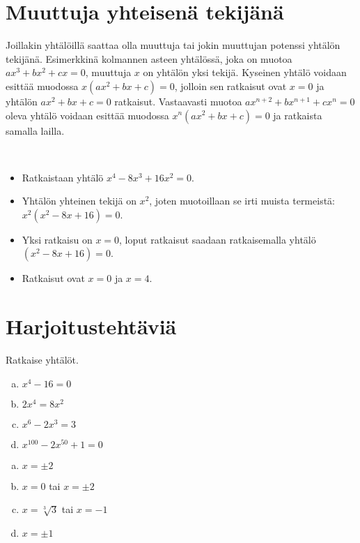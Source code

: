 \section{Muuttuja yhteisenä tekijänä}

Joillakin yhtälöillä saattaa olla muuttuja tai jokin muuttujan potenssi yhtälön tekijänä. Esimerkkinä kolmannen asteen yhtälössä, joka on muotoa $ax^3+bx^2+cx=0$, muuttuja $x$ on yhtälön yksi tekijä. Kyseinen yhtälö voidaan esittää muodossa $x(ax^2+bx+c)=0$, jolloin sen ratkaisut ovat $x=0$ ja yhtälön $ax^2+bx+c=0$ ratkaisut. Vastaavasti muotoa $ax^{n+2}+bx^{n+1}+cx^n=0$ oleva yhtälö voidaan esittää muodossa $x^n(ax^2+bx+c)=0$ ja ratkaista samalla lailla.

\begin{esimerkki}{\ }
\begin{itemize}
    \item Ratkaistaan yhtälö $x^4-8x^3+16x^2=0$.
    \item Yhtälön yhteinen tekijä on $x^2$, joten muotoillaan se irti muista termeistä: $x^2(x^2-8x+16)=0$.
    \item Yksi ratkaisu on $x=0$, loput ratkaisut saadaan ratkaisemalla yhtälö $(x^2-8x+16)=0$.
    \item Ratkaisut ovat $x=0$ ja $x=4$.

\end{itemize}
\end{esimerkki}

\section{Harjoitustehtäviä}

\begin{tehtava}
    Ratkaise yhtälöt.
    \begin{enumerate}[a)]
        \item $x^4 - 16 = 0$
        \item $2x^4 = 8x^2$
        \item $x^6 - 2x^3 = 3$
        \item $x^{100} - 2x^{50} + 1 = 0$
    \end{enumerate}
    \begin{vastaus}
        \begin{enumerate}[a)]
            \item $x = \pm2$
            \item $x = 0$ tai $x=\pm2$
            \item $x = \sqrt[3]{3}$ tai $x= -1$
            \item $x = \pm1$
        \end{enumerate}
    \end{vastaus}
\end{tehtava}

